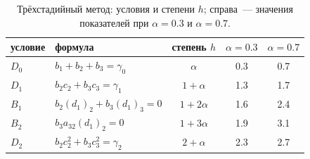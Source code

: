 \documentclass[11pt,a4paper]{article}
\theoremstyle{plain}
\theoremstyle{definition}
\begin{document}
\begin{table}[ht]
\centering\small
\caption{Трёхстадийный метод: условия и степени $h$; справа~--- значения показателей при $\alpha=0.3$ и $\alpha=0.7$.}\label{tab:s3cond}
\begin{tabular}{llccc}
\toprule
условие & формула & степень $h$ & $\alpha=0.3$ & $\alpha=0.7$\\
\midrule
$D_0$ & $b_1+b_2+b_3=\gamma_0$ & $\alpha$ & 0.3 & 0.7\\
$D_1$ & $b_2c_2+b_3c_3=\gamma_1$ & $1+\alpha$ & 1.3 & 1.7\\
$B_1$ & $b_2(d_1)_2+b_3(d_1)_3=0$ & $1+2\alpha$ & 1.6 & 2.4\\
$B_2$ & $b_3a_{32}(d_1)_2=0$ & $1+3\alpha$ & 1.9 & 3.1\\
$D_2$ & $b_2c_2^2+b_3c_3^2=\gamma_2$ & $2+\alpha$ & 2.3 & 2.7\\
\bottomrule
\end{tabular}
\end{table}
\end{document}
